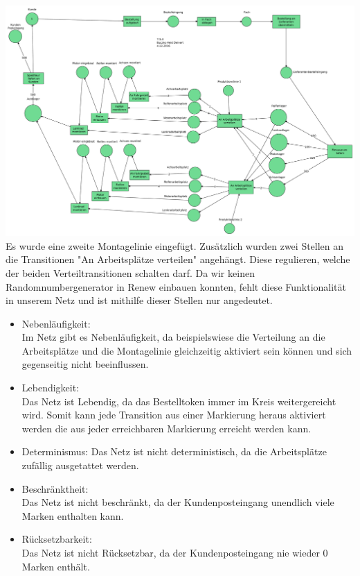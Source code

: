 \documentclass[a4paper,12pt]{scrartcl}
\begin{document}
\subsubsection{}
\includegraphics[scale=0.3]{G-6-A-07-Netz5-Buczko_Heid_Deinert.pdf}\\
Es wurde eine zweite Montagelinie eingefügt. Zusätzlich wurden zwei Stellen an die Transitionen "An Arbeitsplätze verteilen" angehängt. Diese 
regulieren, welche der beiden Verteiltransitionen schalten darf.
Da wir keinen Randomnumbergenerator in Renew einbauen konnten, 
fehlt diese Funktionalität in unserem Netz und ist mithilfe dieser Stellen nur angedeutet.
\begin{itemize}
  \item{Nebenläufigkeit:}\\
  Im Netz gibt es Nebenläufigkeit, da beispielswiese die Verteilung an die Arbeitsplätze und die Montagelinie gleichzeitig aktiviert sein können und sich gegenseitig nicht beeinflussen.
  \item{Lebendigkeit:}\\
  Das Netz ist Lebendig, da das Bestelltoken immer im Kreis weitergereicht wird. Somit kann jede Transition aus einer Markierung heraus aktiviert werden die aus jeder erreichbaren Markierung erreicht werden kann.
  \item{Determinismus:}
  Das Netz ist nicht deterministisch, da die Arbeitsplätze zufällig ausgetattet werden.
  \item{Beschränktheit:}\\
  Das Netz ist nicht beschränkt, da der Kundenposteingang unendlich viele Marken enthalten kann.
  \item{Rücksetzbarkeit:}\\
  Das Netz ist nicht Rücksetzbar, da der Kundenposteingang nie wieder 0 Marken enthält.
\end{itemize}
\end{document}
